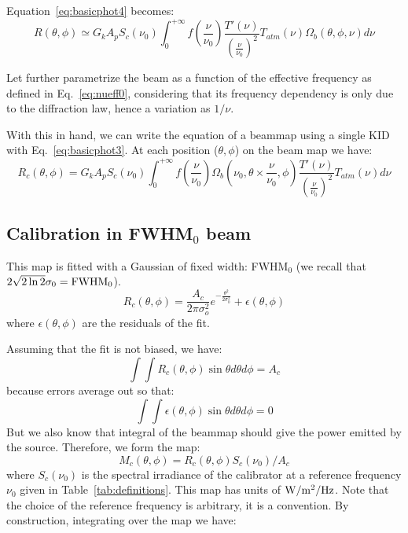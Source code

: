 Equation~\ref{eq:basicphot4} becomes:
\begin{equation}
R(\theta, \phi) \simeq G_{k}  A_{p}  S_{c} (\nu_{0}) \int_{0}^{+\infty} f(\frac{\nu}{\nu_{0}})  
\frac{T'(\nu)}{\left(\frac{\nu}{\nu_{0}}\right)^{2}} T_{atm}(\nu) \Omega_{b} (\theta, \phi, \nu)  d\nu 
\label{eq:basicphot5}
\end{equation}

Let further parametrize the beam as a function
of the effective frequency as defined in Eq.~\ref{eq:nueff0},
considering that its frequency dependency is only due to the diffraction law,
hence a variation as $1/\nu$.

With this in hand, we can write the equation of a beammap using a
single KID with Eq.~\ref{eq:basicphot3}. At each position ($\theta,
\phi$) on the beam map we have:
\begin{equation}
R_{c}(\theta, \phi) =  G_{k} A_{p} S_{c} (\nu_{0})  \int_{0}^{+\infty}
f(\frac{\nu}{\nu_{0}}) \Omega_{b}(\nu_{0}, \theta \times \frac{\nu}{\nu_{0}},
\phi) \frac{T'(\nu)}{\left(\frac{\nu}{\nu_{0}}\right)^{2}}
T_{atm}(\nu) d\nu
\label{eq:beammap}
\end{equation}

\subsection{Calibration in FWHM$_{0}$ beam}
\label{ap:flux_density_equation}

This map is fitted with a Gaussian of fixed width: FWHM$_{0}$ (we
recall that $2 \sqrt{2\ln{2}} \sigma_{0} =  {\rm FWHM}_{0}$).
\begin{equation} 
R_{c}(\theta, \phi) = \frac{A_{c}}{2 \pi \sigma_{o}^{2}}
e^{-\frac{\theta^{2}}{2\sigma_{0}^{2}}}  + \epsilon(\theta, \phi)
\end{equation}
where $\epsilon(\theta, \phi)$ are the residuals of the fit.

Assuming that the fit is not biased, we have:
\begin{equation} 
\int\int R_{c}(\theta, \phi) \sin \theta d\theta d\phi = A_{c}
\end{equation}
because errors average out so that:
\begin{equation} 
\int\int \epsilon (\theta, \phi) \sin \theta d\theta d\phi = 0
\end{equation}
But we also know that integral of the beammap should give the power
emitted by the source. Therefore, we form the map:
\begin{equation}
M_{c}(\theta, \phi) = R_{c}(\theta, \phi)   S_{c} (\nu_{0}) / A_{c}
\end{equation}
where  $S_{c} (\nu_{0})$ is the spectral irradiance of the calibrator
at a reference frequency $\nu_{0}$ given in
Table~\ref{tab:definitions}. This map has units of $\rm W/m^{2}/Hz$. Note
that the choice of the reference frequency is arbitrary, it is a
convention. By construction, integrating over the map we have:


